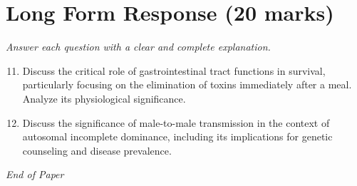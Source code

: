 \documentclass[12pt]{article}
\begin{document}
\section*{Long Form Response (20 marks)}
\textit{Answer each question with a clear and complete explanation.}
\begin{enumerate}[label=\arabic*.]
\setcounter{enumi}{10}
\item Discuss the critical role of gastrointestinal tract functions in survival, particularly focusing on the elimination of toxins immediately after a meal. Analyze its physiological significance.
\item Discuss the significance of male-to-male transmission in the context of autosomal incomplete dominance, including its implications for genetic counseling and disease prevalence.
\end{enumerate}

\vfill
\noindent\textit{End of Paper}
\end{document}

